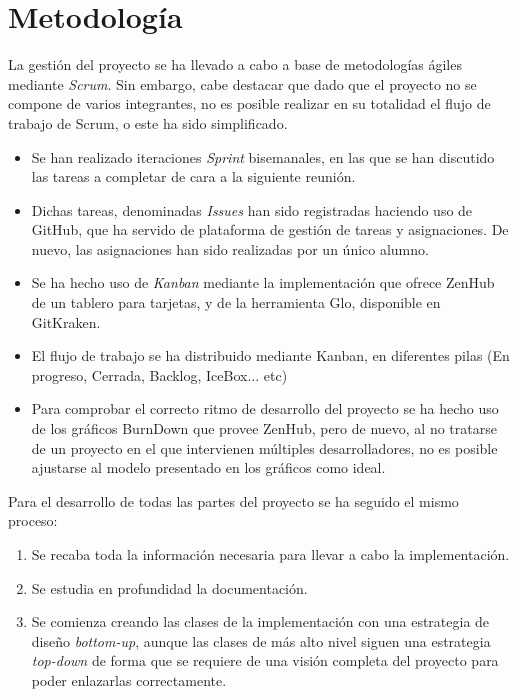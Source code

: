 \section{Metodología}

La gestión del proyecto se ha llevado a cabo a base de metodologías ágiles mediante \emph{Scrum}.
Sin embargo, cabe destacar que dado que el proyecto no se compone de varios integrantes, no es posible realizar en su totalidad el flujo de trabajo de Scrum, o este ha sido simplificado. 

\begin{itemize} 
\item Se han realizado iteraciones \emph{Sprint} bisemanales, en las que se han discutido las tareas a completar de cara a la siguiente reunión. 
\item Dichas tareas, denominadas \emph{Issues} han sido registradas haciendo uso de GitHub, que ha servido de plataforma de gestión de tareas y asignaciones. De nuevo, las asignaciones han sido realizadas por un único alumno. 
\item Se ha hecho uso de \emph{Kanban} mediante la implementación que ofrece ZenHub de un tablero para tarjetas, y de la herramienta Glo, disponible en GitKraken. 
\item El flujo de trabajo se ha distribuido mediante Kanban, en diferentes pilas (En progreso, Cerrada, Backlog, IceBox... etc)
\item Para comprobar el correcto ritmo de desarrollo del proyecto se ha hecho uso de los gráficos BurnDown que provee ZenHub, pero de nuevo, al no tratarse de un proyecto en el que intervienen múltiples desarrolladores, no es posible ajustarse al modelo presentado en los gráficos como ideal. 
\end{itemize}

Para el desarrollo de todas las partes del proyecto se ha seguido el mismo proceso: 
\begin{enumerate}
\item Se recaba toda la información necesaria para llevar a cabo la implementación.
\item Se estudia en profundidad la documentación.
\item Se comienza creando las clases de la implementación con una estrategia de diseño \emph{bottom-up}, aunque las clases de más alto nivel siguen una estrategia \emph{top-down} de forma que se requiere de una visión completa del proyecto para poder enlazarlas correctamente.
\end{enumerate}

